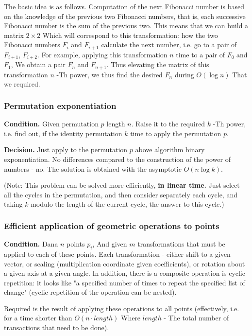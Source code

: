 The basic idea is as follows. Computation of the next Fibonacci number is based on the knowledge of the previous two Fibonacci numbers, that is, each successive Fibonacci number is the sum of the previous two. This means that we can build a matrix $2 \times 2$ Which will correspond to this transformation: how the two Fibonacci numbers $F_i$ and $F_ {i +1}$ calculate the next number, i.e. go to a pair of $F_ {i +1}$, $F_ {i +2}$. For example, applying this transformation $n$ time to a pair of $F_0$ and $F_1$, We obtain a pair $F_n$ and $F_ {n +1}$. Thus elevating the matrix of this transformation $n$ -Th power, we thus find the desired $F_n$ during $O (\log n)$ That we required.

\subsubsection{ Permutation exponentiation }

\textbf{Condition.} Given permutation $p$ length $n$. Raise it to the required $k$ -Th power, i.e. find out, if the identity permutation $k$ time to apply the permutation $p$.

\textbf{Decision.} Just apply to the permutation $p$ above algorithm binary exponentiation. No differences compared to the construction of the power of numbers - no. The solution is obtained with the asymptotic $O (n \log k)$.

(Note: This problem can be solved more efficiently, \textbf{in linear time.} Just select all the cycles in the permutation, and then consider separately each cycle, and taking $k$ modulo the length of the current cycle, the answer to this cycle.)

\subsubsection{ Efficient application of geometric operations to points }

\textbf{Condition.} Dana $n$ points $p_i$, And given $m$ transformations that must be applied to each of these points. Each transformation - either shift to a given vector, or scaling (multiplication coordinate given coefficients), or rotation about a given axis at a given angle. In addition, there is a composite operation is cyclic repetition: it looks like "a specified number of times to repeat the specified list of change" (cyclic repetition of the operation can be nested).

Required is the result of applying these operations to all points (effectively, i.e. for a time shorter than $O (n \cdot length)$ Where $length$ - The total number of transactions that need to be done).

